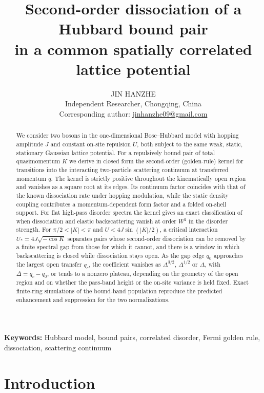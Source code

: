 \documentclass[12pt,a4paper]{article}
\title{Second-order dissociation of a Hubbard bound pair\\ in a common spatially correlated lattice potential}
\author{JIN HANZHE\\[2pt]
\small Independent Researcher, Chongqing, China\\
\small Corresponding author: \href{mailto:jinhanzhe09@gmail.com}{jinhanzhe09@gmail.com}}
\date{}
\theoremstyle{remark}
\newcommand{\Ustar}{U_{*}}
\begin{document}
\maketitle

\begin{abstract}
We consider two bosons in the one-dimensional Bose--Hubbard model with hopping amplitude $J$ and constant on-site repulsion $U$, both subject to the same weak, static, stationary Gaussian lattice potential. For a repulsively bound pair of total quasimomentum $K$ we derive in closed form the second-order (golden-rule) kernel for transitions into the interacting two-particle scattering continuum at transferred momentum $q$. The kernel is strictly positive throughout the kinematically open region and vanishes as a square root at its edges. Its continuum factor coincides with that of the known dissociation rate under hopping modulation, while the static density coupling contributes a momentum-dependent form factor and a folded on-shell support. For flat high-pass disorder spectra the kernel gives an exact classification of when dissociation and elastic backscattering vanish at order $W^2$ in the disorder strength. For $\pi/2<|K|<\pi$ and $U<4J\sin(|K|/2)$, a critical interaction $\Ustar=4J\sqrt{-\cos K}$ separates pairs whose second-order dissociation can be removed by a finite spectral gap from those for which it cannot, and there is a window in which backscattering is closed while dissociation stays open. As the gap edge $q_0$ approaches the largest open transfer $q_c$, the coefficient vanishes as $\Delta^{3/2}$, $\Delta^{1/2}$ or $\Delta$, with $\Delta=q_c-q_0$, or tends to a nonzero plateau, depending on the geometry of the open region and on whether the pass-band height or the on-site variance is held fixed. Exact finite-ring simulations of the bound-band population reproduce the predicted enhancement and suppression for the two normalizations.
\end{abstract}

\noindent\textbf{Keywords:} Hubbard model, bound pairs, correlated disorder, Fermi golden rule, dissociation, scattering continuum

\section{Introduction}
\end{document}
